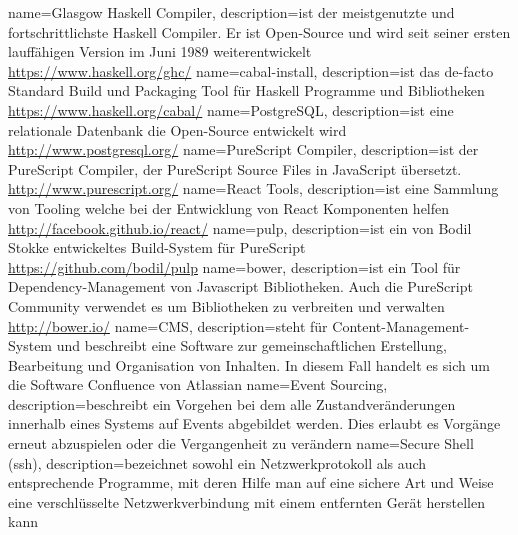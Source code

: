 {
  name=Glasgow Haskell Compiler,
  description={ist der meistgenutzte und fortschrittlichste Haskell Compiler.
    Er ist Open-Source und wird seit seiner ersten lauffähigen Version im Juni 1989 weiterentwickelt\\
    \url{https://www.haskell.org/ghc/}
  }
}
{
  name=cabal-install,
  description={ist das de-facto Standard Build und Packaging Tool für Haskell Programme und Bibliotheken\\
    \url{https://www.haskell.org/cabal/}
  }
}
{
  name=PostgreSQL,
  description={ist eine relationale Datenbank die Open-Source entwickelt wird\\
    \url{http://www.postgresql.org/}
  }
}
{
  name=PureScript Compiler,
  description={ist der PureScript Compiler, der PureScript Source Files in JavaScript übersetzt.\\
    \url{http://www.purescript.org/}
  }
}
{
  name=React Tools,
  description={ist eine Sammlung von Tooling welche bei der Entwicklung von React Komponenten helfen\\
    \url{http://facebook.github.io/react/}
  }
}
{
  name=pulp,
  description={ist ein von Bodil Stokke entwickeltes Build-System für PureScript\\
    \url{https://github.com/bodil/pulp}
  }
}
{
  name=bower,
  description={ist ein Tool für Dependency-Management von Javascript Bibliotheken. Auch die PureScript Community
    verwendet es um Bibliotheken zu verbreiten und verwalten\\
    \url{http://bower.io/}
  }
}
{
  name=CMS,
  description={steht für Content-Management-System und beschreibt eine Software zur gemeinschaftlichen
    Erstellung, Bearbeitung und Organisation von Inhalten. In diesem Fall handelt es sich um die Software
    Confluence von Atlassian
  }
}
{
  name=Event Sourcing,
  description={beschreibt ein Vorgehen bei dem alle Zustandveränderungen
    innerhalb eines Systems auf Events abgebildet werden. Dies erlaubt es Vorgänge
    erneut abzuspielen oder die Vergangenheit zu verändern
  }
}
{
  name=Secure Shell (ssh),
  description={bezeichnet sowohl ein Netzwerkprotokoll als auch entsprechende Programme, mit deren Hilfe man auf eine sichere Art und Weise eine verschlüsselte Netzwerkverbindung mit einem entfernten Gerät herstellen kann
  }
}

